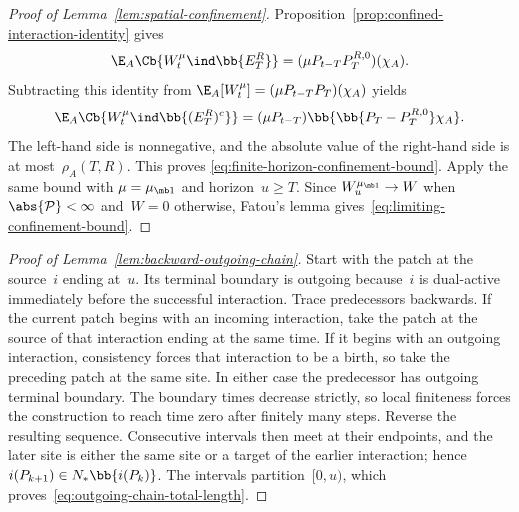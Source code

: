 \begin{proof}[Proof of Lemma~\ref{lem:spatial-confinement}]
Proposition~\ref{prop:confined-interaction-identity} gives
\begin{equation*}
\E_A\Cb{W_t^\mu\ind\bb{E_T^R}}
=
(\mu P_{t-T}P_T^{R,0})(\chi_A).
\end{equation*}
Subtracting this identity from
$\E_A[W_t^\mu]=(\mu P_{t-T}P_T)(\chi_A)$ yields
\begin{equation*}
\E_A\Cb{W_t^\mu\ind\bb{(E_T^R)^c}}
=
(\mu P_{t-T})\bb{\bb{P_T-P_T^{R,0}}\chi_A}.
\end{equation*}
The left-hand side is nonnegative, and the absolute value of the right-hand
side is at most~$\rho_A(T,R)$. This proves
\eqref{eq:finite-horizon-confinement-bound}. Apply the same bound with
$\mu=\mu_{\mb 1}$ and horizon~$u\geq T$. Since
$W_u^{\mu_{\mb 1}}\to W$ when~$\abs{\mathcal P}<\infty$ and~$W=0$ otherwise,
Fatou's lemma gives~\eqref{eq:limiting-confinement-bound}.
\end{proof}

\begin{proof}[Proof of Lemma~\ref{lem:backward-outgoing-chain}]
Start with the patch at the source~$i$ ending at~$u$. Its terminal boundary is
outgoing because~$i$ is dual-active immediately before the successful
interaction. Trace predecessors backwards. If the current patch begins with an
incoming interaction, take the patch at the source of that interaction ending
at the same time. If it begins with an outgoing interaction, consistency forces
that interaction to be a birth, so take the preceding patch at the same site.
In either case the predecessor has outgoing terminal boundary. The boundary
times decrease strictly, so local finiteness forces the construction to reach
time zero after finitely many steps. Reverse the resulting sequence. Consecutive
intervals then meet at their endpoints, and the later site is either the same
site or a target of the earlier interaction; hence
$i(P_{k+1})\in N_*\bb{i(P_k)}$. The intervals partition~$[0,u)$, which
proves~\eqref{eq:outgoing-chain-total-length}.
\end{proof}

